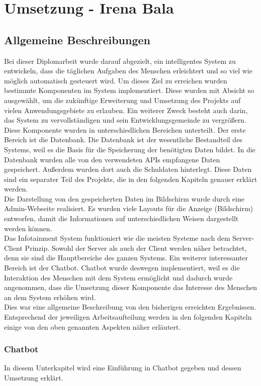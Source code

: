 \chapter{Umsetzung - Irena Bala}
\section{Allgemeine Beschreibungen}
Bei dieser Diplomarbeit wurde darauf abgezielt, ein intelligentes System zu entwickeln, dass die täglichen Aufgaben des Menschen erleichtert und so viel wie möglich automatisch gesteuert wird. Um dieses Ziel zu erreichen wurden bestimmte Komponenten im System implementiert. Diese wurden mit Absicht so ausgewählt, um die zukünftige Erweiterung und Umsetzung des Projekts auf vielen Anwendungsgebiete zu erlauben.  Ein weiterer Zweck besteht auch darin, das System zu vervollständigen und sein Entwicklungsgemeinde zu vergrößern. \\
Diese Komponente wurden in unterschiedlichen Bereichen unterteilt. Der erste Bereich ist die Datenbank. Die Datenbank ist der wesentliche Bestandteil des Systems, weil es die Basis für die Speicherung der benötigten Daten bildet. In die Datenbank wurden alle von den verwendeten APIs empfangene Daten gespeichert. Außerdem wurden dort auch die Schuldaten hinterlegt. Diese Daten sind ein separater Teil des Projekts, die in den folgenden Kapiteln genauer erklärt werden. \\
Die Darstellung von den gespeicherten Daten im Bildschirm wurde durch eine Admin-Webseite realisiert. Es wurden viele Layouts für die Anzeige (Bildschirm) entworfen, damit die Informationen auf unterschiedlichen Weisen dargestellt werden können. \\
Das Infotainment System funktioniert wie die meisten Systeme nach dem Server- Client Prinzip. Sowohl der Server als auch der Client werden näher betrachtet, denn sie sind die Hauptbereiche des ganzen Systems. 
Ein weiterer interessanter Bereich ist der Chatbot. Chatbot wurde deswegen implementiert, weil es die Interaktion des Menschen mit dem System ermöglicht und dadurch wurde angenommen, dass die Umsetzung dieser Komponente das Interesse des Menschen an dem System erhöhen wird. \\
Dies war eine allgemeine Beschreibung von den bisherigen erreichten Ergebnissen. Entsprechend der jeweiligen Arbeitsaufteilung werden in den folgenden Kapiteln einige von den oben genannten Aspekten näher erläutert. \\
\subsection{Chatbot} 
In diesem Unterkapitel wird eine Einführung in Chatbot gegeben und dessen Umsetzung erklärt.
